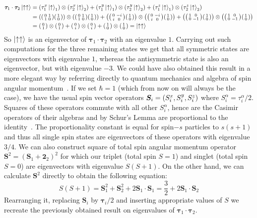 \begin{align*}
    \bm{\tau}_1 \cdot \bm{\tau}_2 \ket{\uparrow\uparrow} &= 
    \left(\tau_1^x \ket{\uparrow}_1\right) \otimes \left(\tau^x_2 \ket{\uparrow}_2\right) + 
    \left(\tau_1^y \ket{\uparrow}_1\right) \otimes \left(\tau^y_2 \ket{\uparrow}_2\right) +
    \left(\tau_1^z \ket{\uparrow}_1\right) \otimes \left(\tau^z_2 \ket{\uparrow}_2\right)\nonumber\\
    &= \left( \smqty(\pmat{1}) \smqty(1\\0)\right) \otimes \left( \smqty(\pmat{1}) \smqty(1\\0)\right) +
    \left( \smqty(\pmat{2}) \smqty(1\\0)\right) \otimes \left( \smqty(\pmat{2}) \smqty(1\\0)\right)+
    \left( \smqty(\pmat{3}) \smqty(1\\0)\right) \otimes \left( \smqty(\pmat{3}) \smqty(1\\0)\right)\\
    &= \smqty(0\\1) \otimes \smqty(0\\1) + \smqty(0\\i) \otimes \smqty(0\\i) + 
    \smqty(1\\0) \otimes \smqty(1\\0) = \ket{\uparrow\uparrow}
\end{align*}
So \(\ket{\uparrow\uparrow}\) is an eigenvector of \(\bm{\tau}_1 \cdot \bm{\tau}_2\) with
an eigenvalue \(1\). Carrying out such computations for the three remaining states we get
that all symmetric states are eigenvectors with eigenvalue \(1\), whereas the
antisymmetric state is also an eigenvector, but with eigenvalue \(-3\). 
We could have also obtained this result in a more elegant way by referring directly
to quantum mechanics and algebra of spin angular momentum~\autocite{Sakurai2017}.
If we set \(\hbar = 1\) (which from now on will always be the case), we have the usual
spin vector operators \(\bm{S}_i = \left(S^{x}_i,S^{y}_i, S^{z}_i\right) \) where
 \(S_i^{\alpha} = \tau_i^{\alpha}/2\).
Squares of these operators commute with all other \(S_i^{\alpha}\), hence are the
Casimir operators of their algebras and by Schur's Lemma are proportional to
the identity~\autocite{Woit2017}.
The proportionality constant is equal for spin\(-s\) particles to \(s(s+1)\) and thus
all single spin states are eigenvectors of these operators with eigenvalue \(3/4\). 
We can also construct square of total spin angular momentum operator
\(\bm{S}^2 = (\bm{S}_1 + \bm{2}_2)^2\) for which our triplet (total spin \(S=1\)) and singlet
(total spin \(S=0\)) are eigenvectors with eigenvalue \(S(S+1)\). On the other hand, we 
can calculate \(\bm{S}^2\) directly to obtain the following equation:
\begin{equation}
    S(S+1) = \bm{S}_1^2 + \bm{S}_2^2 + 2\bm{S}_1\cdot \bm{S}_1 = \frac{3}{2} + 2\bm{S}_1\cdot\bm{S}_2
\end{equation} 
Rearranging it, replacing \(\bm{S}_i\) by \(\bm{\tau}_i/2\) and inserting appropriate values
of \(S\) we recreate the previously obtained result on eigenvalues of 
\(\bm{\tau}_1\cdot\bm{\tau}_2\).

